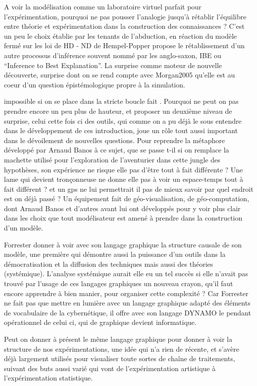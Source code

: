 {A voir la modélisation comme un laboratoire virtuel parfait pour l'expérimentation, pourquoi ne pas pousser l'analogie jusqu'à rétablir l'équilibre entre théorie et expérimentation dans la construction des connaissances ? C'est un peu le choix établie par les tenants de l'abduction,  en réaction du modèle fermé sur les loi de HD - ND de Hempel-Popper propose le rétablissement d'un autre processus d'inférence souvent nommé par les anglo-saxon, IBE ou \foreignquote{english}{Inference to Best Explanation}. La surprise comme moteur de nouvelle découverte, surprise dont on se rend compte avec Morgan2005 qu'elle est au coeur d'un question épistémologique propre à la simulation.

impossible si on se place dans la stricte boucle fait . Pourquoi ne peut on pas prendre encore un peu plus de hauteur, et proposer un deuxième niveau de surprise, celui cette fois ci des outils, qui comme on a pu déjà le sous entendre dans le développement de ces introduction, joue un rôle tout aussi important dans le dévoilement de nouvelles questions. Pour reprendre la métaphore développé par Arnaud Banos \autocite[22]{Banos2013} à ce sujet, que se passe t-il si on remplace la machette utilisé pour l'exploration de l'aventurier dans cette jungle des hypothèses, son expérience ne risque elle pas d'être tout à fait différente ? Une lame qui devient tronçonneuse ne donne elle pas à voir un espace-temps tout à fait différent ? et un gps ne lui permettrait il pas de mieux savoir par quel endroit est on déjà passé ? Un équipement fait de géo-visualisation, de géo-computation, dont Arnaud Banos et d'autres avant lui ont développés pour y voir plus clair dans les choix que tout modélisateur est amené à prendre dans la construction d'un modèle.

Forrester donner à voir avec son langage graphique la structure causale de son modèle, une première qui démontre aussi la puissance d'un outils dans la démocratisation et la diffusion des techniques mais aussi des théories (systémique). L'analyse systémique aurait elle eu un tel succès si elle n'avait pas trouvé par l'usage de ces langages graphiques un nouveau crayon, qu'il faut encore apprendre à bien manier, pour organiser cette complexité ? Car Forrester ne fait pas que mettre en lumière avec un langage graphique adapté des éléments de vocabulaire de la cybernétique, il offre avec son langage DYNAMO le pendant opérationnel de celui ci, qui de graphique devient informatique. 

Peut on donner à présent le même langage graphique pour donner à voir la structure de nos expérimentations, une idée qui n'a rien de récente, et s'avère déjà largement utilisés pour visualiser toute sortes de chaîne de traitements, suivant des buts aussi varié qui vont de l'expérimentation artistique à l'expérimentation statistique.

}
